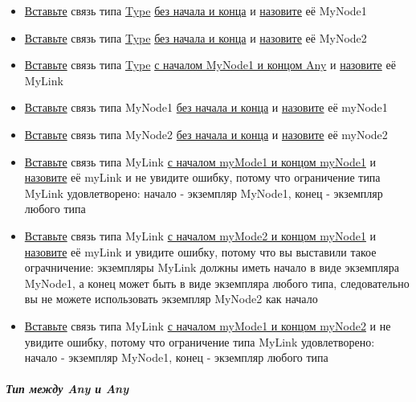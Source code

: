 \documentclass{article}
\begin{document}
\begin{itemize}
  \item \hyperlink{DeepCase.InsertLink.Def}{Вставьте} связь типа \hyperlink{type.Def}{Type} \hyperlink{FAQ.HowToInsertLinkWithoutFromAndTo}{без начала и конца} и \hyperlink{FAQ.HowToSetName}{назовите} её MyNode1
  \item \hyperlink{DeepCase.InsertLink.Def}{Вставьте} связь типа \hyperlink{type.Def}{Type} \hyperlink{FAQ.HowToInsertLinkWithoutFromAndTo}{без начала и конца} и \hyperlink{FAQ.HowToSetName}{назовите} её MyNode2
  \item \hyperlink{DeepCase.InsertLink.Def}{Вставьте} связь типа \hyperlink{type.Def}{Type} \hyperlink{FAQ.HowToInsertLinkWithFromAndTo}{с началом MyNode1 и концом Any} и \hyperlink{FAQ.HowToSetName}{назовите} её MyLink
  \item \hyperlink{DeepCase.InsertLink.Def}{Вставьте} связь типа MyNode1 \hyperlink{FAQ.HowToInsertLinkWithoutFromAndTo}{без начала и конца} и \hyperlink{FAQ.HowToSetName}{назовите} её myNode1
  \item \hyperlink{DeepCase.InsertLink.Def}{Вставьте} связь типа MyNode2 \hyperlink{FAQ.HowToInsertLinkWithoutFromAndTo}{без начала и конца} и \hyperlink{FAQ.HowToSetName}{назовите} её myNode2
  \item \hyperlink{DeepCase.InsertLink.Def}{Вставьте} связь типа MyLink \hyperlink{FAQ.HowToInsertLinkWithFromAndTo}{с началом myMode1 и концом myNode1} и \hyperlink{FAQ.HowToSetName}{назовите} её myLink и не увидите ошибку, потому что ограничение типа MyLink удовлетворено: начало - экземпляр MyNode1, конец - экземпляр любого типа
  \item \hyperlink{DeepCase.InsertLink.Def}{Вставьте} связь типа MyLink \hyperlink{FAQ.HowToInsertLinkWithFromAndTo}{с началом myMode2 и концом myNode1} и \hyperlink{FAQ.HowToSetName}{назовите} её myLink и увидите ошибку, потому что вы выставили такое ограчничение: экземпляры MyLink должны иметь начало в виде экземпляра MyNode1, а конец может быть в виде экземпляра любого типа, следовательно вы не можете использовать экземпляр MyNode2 как начало
  \item \hyperlink{DeepCase.InsertLink.Def}{Вставьте} связь типа MyLink \hyperlink{FAQ.HowToInsertLinkWithFromAndTo}{с началом myMode1 и концом myNode2} и не увидите ошибку, потому что ограничение типа MyLink удовлетворено: начало - экземпляр MyNode1, конец - экземпляр любого типа
\end{itemize}
\subparagraph{Тип между Any и Any}
\end{document}
